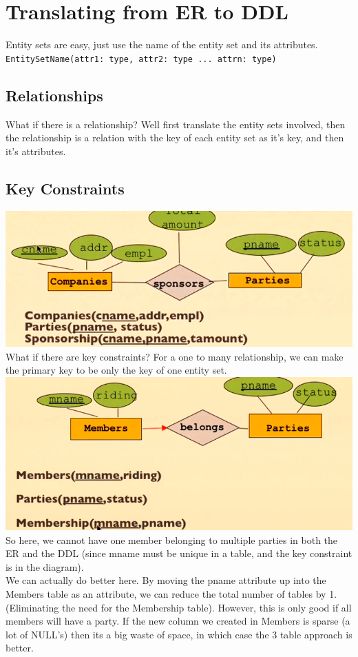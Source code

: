 \documentclass[12pt]{article}
\theoremstyle{definition}
\begin{document}
\section{Translating from ER to DDL}
Entity sets are easy, just use the name of the entity set and its attributes.
\texttt{EntitySetName(attr1: type,  attr2: type ... attrn: type)}
\\ \linebreak
\subsection{Relationships}
What if there is a relationship? Well first translate the entity sets involved, then the relationship is a relation with the key of each entity set as it's key, and then it's attributes.
\subsection{Key Constraints}
\includegraphics{translate}\\
What if there are key constraints?
For a one to many relationship, we can make the primary key to be only the key of one entity set.
\\ \includegraphics{key-constraint}\\
So here, we cannot have one member belonging to multiple parties in both the ER and the DDL (since mname must be unique in a table, and the key constraint is in the diagram). \
\\ \linebreak
We can actually do better here. By moving the pname attribute up into the Members table as an attribute, we can reduce the total number of tables by 1. (Eliminating the need for the Membership table). However, this is only good if all members will have a party. If the new column we created in Members is sparse (a lot of NULL's) then its a big waste of space, in which case the 3 table approach is better.
\\ \linebreak
\end{document}
